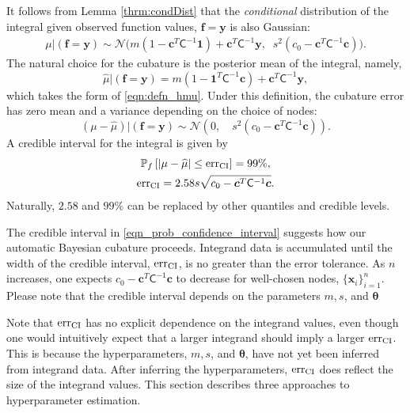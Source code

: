 \documentclass{iitthesis}          %
\newcommand{\bm}[1]{\boldsymbol{#1}}
\newcommand{\vtheta}{{\bm{\theta}}}
\newcommand{\vc}{\bm{c}}
\newcommand{\vf}{\bm{f}}
\newcommand{\vx}{\bm{x}}
\newcommand{\vy}{\bm{y}}
\newcommand{\vone}{\bm{1}}
\newcommand{\mC}{\mathsf{C}}
\newcommand{\calN}{\mathcal{N}}
\newcommand{\hmu}{\widehat{\mu}}
\newcommand{\err}{\textup{err}}
\begin{document}
It follows from Lemma \ref{thrm:condDist} that the \emph{conditional} distribution of the integral given observed function values, $\vf = \vy$ is also Gaussian:
\begin{align} \label{eqn:condInteg}
\mu | (\vf = \vy) \sim \calN \bigl(m (1 - \vc^T \mC^{-1} \vone)  + \vc^T \mC^{-1} \vy, \;\;
s^2(c_0  -\vc ^T \mC^{-1} \vc) \bigr).
\end{align}
The natural choice for  the cubature is the posterior mean of the integral, namely, 
\begin{equation}
\label{eqn:BayesCub}
\widehat{\mu}  \vert ( \vf = \vy)
= m(1 - \vone^T  \mC^{-1}\vc )
+ \vc^T \mC^{-1} \vy,
\end{equation}
which takes the form of \eqref{eqn:defn_hmu}.
Under this definition, the cubature error has zero mean and a variance depending on the choice of nodes:
\begin{equation*}
(\mu-\hmu) | (\vf = \vy)
 \sim  \calN 
\left(
0, \quad
s^2 (c_0 - \vc^T\mC^{-1}\vc) 
\right).
\end{equation*}
A credible interval for the integral is given by 
\begin{subequations} \label{eqn_prob_confidence_interval}
	\begin{gather}
	\mathbb{P}_f \left[
	|\mu-\hmu| \leq \err_{\textup{CI}}
	\right] = 99\%, \\
	\err_{\textup{CI}} = 2.58 s \sqrt{c_{0} - \vc^T\mC^{-1}\vc}.
	\end{gather}
\end{subequations}
Naturally, $2.58$ and $99\%$ can be replaced by other quantiles and credible levels.


\label{sec:stopping_criteria}

The credible interval in \eqref{eqn_prob_confidence_interval} suggests how our automatic Bayesian cubature proceeds.  Integrand data is accumulated until the width of the credible interval, $\err_{\textup{CI}}$, is no greater than the error tolerance.  As $n$ increases, one expects $c_{0} - \vc^T\mC^{-1}\vc$ to decrease for well-chosen nodes, $\{\vx_i\}_{i=1}^n$. Please note that the credible interval depends on the parameters $m, s$, and $\vtheta$

Note that $\err_{\textup{CI}}$ has no explicit dependence on the integrand values, even though one would intuitively expect that a larger integrand should imply a larger $\err_{\textup{CI}}$.  This is because the hyperparameters, $m, s$, and $\vtheta$, have not yet been inferred from integrand data.  After inferring the hyperparameters, $\err_{\textup{CI}}$ does reflect the size of the integrand values. This section describes three approaches to hyperparameter estimation.
\end{document}
